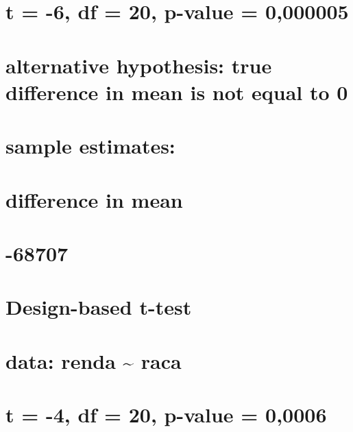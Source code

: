 \documentclass[]{book}
\theoremstyle{definition}
\theoremstyle{definition}
\theoremstyle{definition}
\theoremstyle{remark}
\begin{document}
\section{t = -6, df = 20, p-value =
0,000005}\label{t--6-df-20-p-value-0000005}

\section{alternative hypothesis: true difference in mean is not equal to
0}\label{alternative-hypothesis-true-difference-in-mean-is-not-equal-to-0}

\section{sample estimates:}\label{sample-estimates}

\section{difference in mean}\label{difference-in-mean}

\section{-68707}\label{section-26}

\section{}\label{section-27}

\section{Design-based t-test}\label{design-based-t-test-1}

\section{}\label{section-28}

\section{data: renda \textasciitilde{} raca}\label{data-renda-raca}

\section{t = -4, df = 20, p-value =
0,0006}\label{t--4-df-20-p-value-00006}
\end{document}
